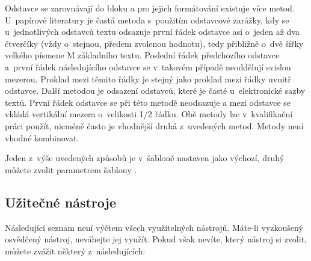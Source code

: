 Odstavce se zarovnávají do bloku a pro jejich formátování existuje více metod. U~papírové literatury je častá metoda s~použitím odstavcové zarážky, kdy se u~jednotlivých odstavců textu odsazuje první řádek odstavce asi o~jeden až dva čtverčíky (vždy o~stejnou, předem zvolenou hodnotu), tedy přibližně o~dvě šířky velkého písmene M základního textu. Poslední řádek předchozího odstavce a~první řádek následujícího odstavce se v~takovém případě neoddělují svislou mezerou. Proklad mezi těmito řádky je stejný jako proklad mezi řádky uvnitř odstavce. \cite{fitWeb} Další metodou je odsazení odstavců, které je časté u~elektronické sazby textů. První řádek odstavce se při této metodě neodsazuje a mezi odstavce se vkládá vertikální mezera o~velikosti 1/2 řádku. Obě metody lze v~kvalifikační práci použít, nicméně často je vhodnější druhá z~uvedených metod. Metody není vhodné kombinovat.

Jeden z~výše uvedených způsobů je v~šabloně nastaven jako výchozí, druhý můžete zvolit parametrem šablony .

\subsection*{Užitečné nástroje}
\label{nastroje}

Následující seznam není výčtem všech využitelných nástrojů. Máte-li vyzkoušený osvědčený nástroj, neváhejte jej využít. Pokud však nevíte, který nástroj si zvolit, můžete zvážit některý z~následujících:

